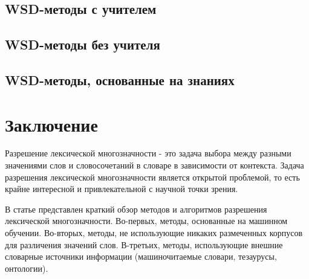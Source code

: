 \documentclass{article}
\begin{document}
\begin{articletext}
\bfullwidth
\begin{center}
\section{WSD-методы с учителем}
\end{center}
\efullwidth






 


\bfullwidth
\begin{center}
\section{WSD-методы без учителя}
\end{center}
\efullwidth








\bfullwidth
\begin{center}
\section{WSD-методы, основанные на знаниях}
\end{center}
\efullwidth







\section{Заключение}

Разрешение лексической многозначности - это задача выбора между разными значениями слов и словосочетаний в словаре в зависимости от контекста. Задача разрешения лексической многозначности является открытой проблемой, то есть крайне интересной и привлекательной с научной точки зрения.

В статье представлен краткий обзор методов и алгоритмов разрешения лексической многозначности. Во-первых, методы, основанные на машинном обучении.  Во-вторых, методы, не использующие никаких размеченных корпусов для различения значений слов. В-третьих, методы, использующие внешние словарные источники информации (машиночитаемые словари, тезаурусы, онтологии).


\end{articletext}
\end{document}
